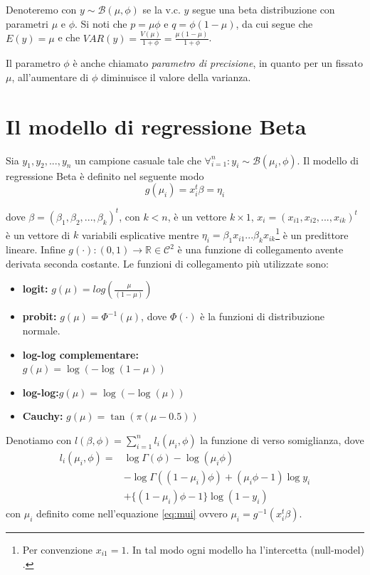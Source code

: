 \documentclass[twoside,twocolumn]{article}
\begin{document}
	
	
	Denoteremo con $y \sim \mathbb{\mathcal{B}}(\mu,\phi)$ se  la v.c. $y$ segue una beta distribuzione con parametri $\mu$ e $\phi$. Si noti che $p=\mu\phi$ e $q=\phi(1-\mu)$, da cui segue che $E(y)=\mu$ e che $VAR(y)=\frac{V(\mu)}{1+\phi}=\frac{\mu(1-\mu)}{1+\phi}$. 
	
	Il parametro $\phi$ è anche chiamato \emph{parametro di precisione}, in quanto  per un fissato $\mu$, all'aumentare di $\phi$ diminuisce il valore della varianza.

\section{Il modello di regressione Beta}
Sia $y_1, y_2, ... ,y_n$ un campione casuale tale che $	\forall_{i=1}^n: y_i \sim \mathbb{\mathcal{B}}(\mu_i, \phi)$. Il modello di regressione Beta è definito nel seguente modo
\begin{equation}g(\mu_i)=x_i^t\beta=\eta_i
\label{eq:mui}
\end{equation}

dove $\beta=(\beta_1, \beta_2, ..., \beta_k)^t$, con $k<n$, è un vettore $k \times 1$, $x_i=(x_{i1}, x_{i2},...,x_{ik})^t$ è un vettore di $k$ variabili esplicative mentre $\eta_i=\beta_1x_{i1}...\beta_kx_{ik}$\footnote{Per convenzione $x_{i1}=1$. In tal modo ogni modello ha l'intercetta (null-model) \cite{PV}. } è un predittore lineare. Infine $g(\cdot):(0,1)\rightarrow\mathbb{R} \in \mathcal{C}^2$ è una funzione  di collegamento avente derivata seconda costante. Le funzioni di collegamento più utilizzate sono:
\begin{itemize}
	\item \textbf{logit:} $g(\mu)=log(\frac{\mu}{(1-\mu)}) $
	\item \textbf{probit:} $g(\mu)=\varPhi^{-1}(\mu)$, dove $\varPhi(\cdot)$ è la funzioni di distribuzione normale.
	\item \textbf{log-log complementare:}\\ $g(\mu)=\log(-\log(1-\mu))$
	\item \textbf{log-log:}$g(\mu)=\log(-\log(\mu))$
	\item \textbf{Cauchy:} $g(\mu)=\tan(\pi(\mu-0.5))$
\end{itemize}

Denotiamo con $l(\beta,\phi)=\sum_{i=1}^{n}l_i(\mu_i,\phi)$ la funzione di verso somiglianza, dove 
\begin{align*}
l_i(\mu_i, \phi)=&\log \Gamma(\phi)-\log (\mu_i\phi)\\
&-\log\Gamma((1-\mu_i)\phi)+(\mu_i\phi-1)\log y_i \\&
+  \{(1-\mu_i)\phi -1 \}\log(1-y_i)
\end{align*}
con $\mu_i$ definito come nell'equazione \eqref{eq:mui} ovvero $\mu_i=g^{-1}(x_i^t\beta)$.
\end{document}
